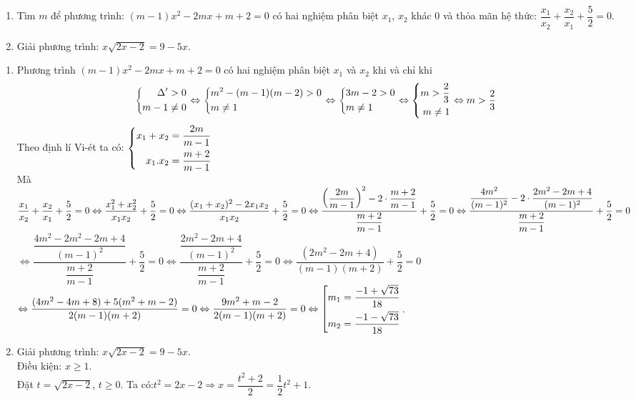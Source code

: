 \begin{ex}%
    \hfill
    \begin{enumerate}
        \item Tìm $m$ để  phương trình: $(m-1)x^2-2mx+m+2=0$ có hai nghiệm phân biệt $x_1$, $x_2$ khác $0$ và thỏa mãn hệ thức: $\dfrac{x_1}{x_2}+\dfrac{x_2}{x_1}+\dfrac{5}{2}=0$.
        \item Giải phương trình: $x\sqrt{2x-2}=9-5x$.
    \end{enumerate}
\loigiai
    {
    \begin{enumerate}
        \item Phương trình $(m-1)x^2-2mx+m+2=0$ có hai nghiệm phân biệt $x_1$ và $x_2$ khi và chỉ khi
        \[\left\{\begin{aligned}\Delta'>0\\
        m-1\ne0\end{aligned}\right.\Leftrightarrow \left\{\begin{aligned}&m^2-(m-1)(m-2)>0\\&m\ne1\end{aligned}\right.\Leftrightarrow\left\{\begin{aligned}&3m-2>0\\&m\ne1\end{aligned}\right.\Leftrightarrow \left\{\begin{aligned}m>\dfrac{2}{3}\\m\ne 1\end{aligned}\right.\Leftrightarrow m>\dfrac{2}{3}\]
    Theo định lí Vi-ét ta có: $\left\{\begin{aligned}x_1+x_2&=\dfrac{2m}{m-1}\\
    x_1.x_2&=\dfrac{m+2}{m-1}\end{aligned}\right.$\\
Mà $\dfrac{x_1}{x_2}+\dfrac{x_2}{x_1}+\dfrac{5}{2}=0\Leftrightarrow \dfrac{x_1^2+x_2^2}{x_1x_2}+\dfrac{5}{2}=0\Leftrightarrow \dfrac{(x_1+x_2)^2-2x_1x_2}{x_1x_2}+\dfrac{5}{2}=0\\
\Leftrightarrow\dfrac{\left(\dfrac{2m}{m-1}\right)^2-2\cdot\dfrac{m+2}{m-1}}{\dfrac{m+2}{m-1}}+\dfrac{5}{2}=0\Leftrightarrow \dfrac{\dfrac{4m^2}{(m-1)^2}-2\cdot\dfrac{2m^2-2m+4}{(m-1)^2}}{\dfrac{m+2}{m-1}}+\dfrac{5}{2}=0$\\
$\Leftrightarrow\dfrac{\dfrac{4m^2-2m^2-2m+4}{(m-1)^2}}{\dfrac{m+2}{m-1}}+\dfrac{5}{2}=0\Leftrightarrow \dfrac{\dfrac{2m^2-2m+4}{(m-1)^2}}{\dfrac{m+2}{m-1}}+\dfrac{5}{2}=0\Leftrightarrow\dfrac{(2m^2-2m+4)}{(m-1)(m+2)}+\dfrac{5}{2}=0$\\
$\Leftrightarrow\dfrac{(4m^2-4m+8)+5(m^2+m-2)}{2(m-1)(m+2)}=0\Leftrightarrow\dfrac{9m^2+m-2}{2(m-1)(m+2)}=0\Leftrightarrow \left[\begin{aligned}m_1&=\dfrac{-1+\sqrt{73}}{18}\\
m_2&=\dfrac{-1-\sqrt{73}}{18}\end{aligned}\right.$.
\item Giải phương trình: $x\sqrt{2x-2}=9-5x$.\\
Điều kiện: $x\geq1$.\\
Đặt $t=\sqrt{2x-2}$, $t\geq0$.
Ta có:$t^2=2x-2\Rightarrow x=\dfrac{t^2+2}{2}=\dfrac{1}{2}t^2+1$.\\

\end{enumerate}}
\end{ex}
